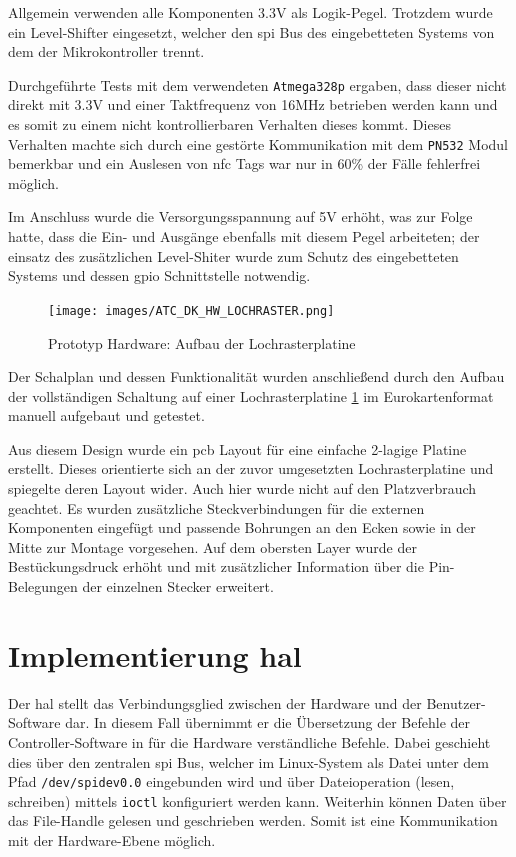Allgemein verwenden alle Komponenten 3.3V als Logik-Pegel. Trotzdem
wurde ein Level-Shifter eingesetzt, welcher den \gls{spi} Bus des
eingebetteten Systems von dem der Mikrokontroller trennt.

Durchgeführte Tests mit dem verwendeten
\passthrough{\lstinline!Atmega328p!} ergaben, dass dieser nicht direkt
mit 3.3V und einer Taktfrequenz von 16MHz betrieben werden kann und es
somit zu einem nicht kontrollierbaren Verhalten dieses kommt. Dieses
Verhalten machte sich durch eine gestörte Kommunikation mit dem
\passthrough{\lstinline!PN532!} Modul bemerkbar und ein Auslesen von
\gls{nfc} Tags war nur in 60\% der Fälle fehlerfrei möglich.

Im Anschluss wurde die Versorgungsspannung auf 5V erhöht, was zur Folge
hatte, dass die Ein- und Ausgänge ebenfalls mit diesem Pegel arbeiteten;
der einsatz des zusätzlichen Level-Shiter wurde zum Schutz des
eingebetteten Systems und dessen \gls{gpio} Schnittstelle notwendig.

\begin{figure}
\centering
\texttt{[image: images/ATC\_DK\_HW\_LOCHRASTER.png]}
\caption{Prototyp Hardware: Aufbau der Lochrasterplatine
\label{ATC_DK_HW_LOCHRASTER}}
\end{figure}

Der Schalplan und dessen Funktionalität wurden anschließend durch den
Aufbau der vollständigen Schaltung auf einer Lochrasterplatine
\ref{ATC_DK_HW_LOCHRASTER} im Eurokartenformat manuell aufgebaut und
getestet.

Aus diesem Design wurde ein \gls{pcb} Layout für eine einfache 2-lagige
Platine erstellt. Dieses orientierte sich an der zuvor umgesetzten
Lochrasterplatine und spiegelte deren Layout wider. Auch hier wurde
nicht auf den Platzverbrauch geachtet. Es wurden zusätzliche
Steckverbindungen für die externen Komponenten eingefügt und passende
Bohrungen an den Ecken sowie in der Mitte zur Montage vorgesehen. Auf
dem obersten Layer wurde der Bestückungsdruck erhöht und mit
zusätzlicher Information über die Pin-Belegungen der einzelnen Stecker
erweitert.

\hypertarget{implementierung-hal}{%
\section{\texorpdfstring{Implementierung
\gls{hal}}{Implementierung }}\label{implementierung-hal}}

Der \gls{hal} stellt das Verbindungsglied zwischen der Hardware und der
Benutzer-Software dar. In diesem Fall übernimmt er die Übersetzung der
Befehle der Controller-Software in für die Hardware verständliche
Befehle. Dabei geschieht dies über den zentralen \gls{spi} Bus, welcher
im Linux-System als Datei unter dem Pfad
\passthrough{\lstinline!/dev/spidev0.0!} eingebunden wird und über
Dateioperation (lesen, schreiben) mittels
\passthrough{\lstinline!ioctl!} konfiguriert werden kann. Weiterhin
können Daten über das File-Handle gelesen und geschrieben werden. Somit
ist eine Kommunikation mit der Hardware-Ebene möglich.

